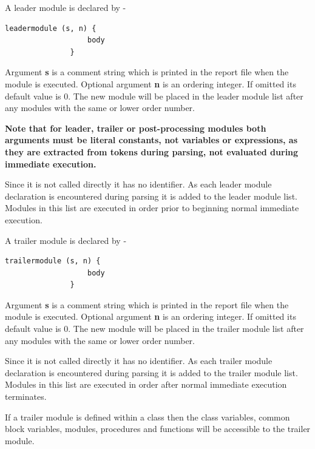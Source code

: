            A leader module is declared by -
            \begin{lstlisting}[gobble=12, language=threepl]
               leadermodule (s, n) {
                   body
               }
            \end{lstlisting}
            Argument {\bf s} is a comment string which is printed in the report
            file when the module is executed. Optional argument {\bf n} is an
            ordering integer. If omitted its default value is 0. The new module
            will be placed in the leader module list after any modules with the
            same or lower order number.
            
            {\bf Note that for leader, trailer or post-processing modules both
            arguments must be literal constants, not variables or expressions, as
            they are extracted from tokens during parsing, not evaluated during
            immediate execution.}

            Since it is not called directly it has no identifier. As each leader
            module declaration is encountered during parsing it is added to the
            leader module list. Modules in this list are executed in order prior
            to beginning normal immediate execution.
            
            A trailer module is declared by -
            \begin{lstlisting}[gobble=12, language=threepl]
               trailermodule (s, n) {
                   body
               }
            \end{lstlisting}
            Argument {\bf s} is a comment string which is printed in the report
            file when the module is executed. Optional argument {\bf n} is an
            ordering integer. If omitted its default value is 0. The new module
            will be placed in the trailer module list after any modules with the
            same or lower order number.

            Since it is not called directly it has no identifier. As each
            trailer module declaration is encountered during parsing it is added
            to the trailer module list. Modules in this list are executed in
            order after normal immediate execution terminates.
            
            If a trailer module is defined within a class then the class
            variables, common block variables, modules, procedures and functions
            will be accessible to the trailer module.
            
